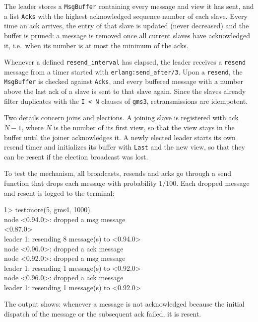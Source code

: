 \documentclass[a4paper, 11pt]{article}
\begin{document}
The leader stores a \texttt{MsgBuffer} containing every message and view it has sent, and a list \texttt{Acks} with the highest acknowledged sequence number of each slave. Every time an ack arrives, the entry of that slave is updated (never decreased) and the buffer is pruned: a message is removed once all current slaves have acknowledged it, i.e.\ when its number is at most the minimum of the acks.

Whenever a defined \texttt{resend\_interval} has elapsed, the leader receives a \texttt{resend} message from a timer started with \texttt{erlang:send\_after/3}. Upon a \texttt{resend}, the \texttt{MsgBuffer} is checked against \texttt{Acks}, and every buffered message with a number above the last ack of a slave is sent to that slave again. Since the slaves already filter duplicates with the \texttt{I < N} clauses of \texttt{gms3}, retransmissions are idempotent.

Two details concern joins and elections. A joining slave is registered with ack $N-1$, where $N$ is the number of its first view, so that the view stays in the buffer until the joiner acknowledges it. A newly elected leader starts its own resend timer and initializes its buffer with \texttt{Last} and the new view, so that they can be resent if the election broadcast was lost.

To test the mechanism, all broadcasts, resends and acks go through a send function that drops each message with probability $1/100$. Each dropped message and resent is logged to the terminal:
\begin{tcolorbox}[terminalbox]
1> test:more(5, gms4, 1000). \\
node <0.94.0>: dropped a msg message \\
<0.87.0> \\
leader 1: resending 8 message(s) to <0.94.0> \\
node <0.96.0>: dropped a ack message \\
node <0.92.0>: dropped a msg message \\
leader 1: resending 1 message(s) to <0.92.0> \\
node <0.96.0>: dropped a ack message \\
leader 1: resending 1 message(s) to <0.92.0> \\
\end{tcolorbox}
The output shows: whenever a message is not acknowledged because the initial dispatch of the message or the subsequent ack failed, it is resent.
\end{document}
